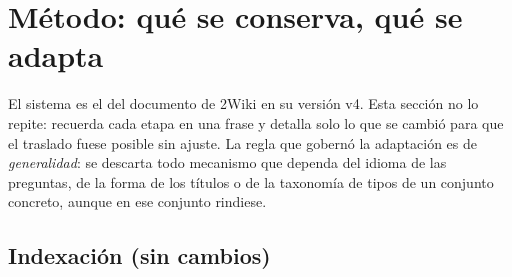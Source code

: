 \documentclass[11pt,a4paper]{article}
\begin{document}
\section{Método: qué se conserva, qué se adapta}
\label{sec:adaptacion}

El sistema es el del documento de 2Wiki en su versión v4. Esta sección no lo
repite: recuerda cada etapa en una frase y detalla solo lo que se cambió
para que el traslado fuese posible sin ajuste. La regla que gobernó la
adaptación es de \emph{generalidad}: se descarta todo mecanismo que dependa
del idioma de las preguntas, de la forma de los títulos o de la taxonomía de
tipos de un conjunto concreto, aunque en ese conjunto rindiese.

\subsection{Indexación (sin cambios)}
\label{sec:indexacion}
\end{document}

